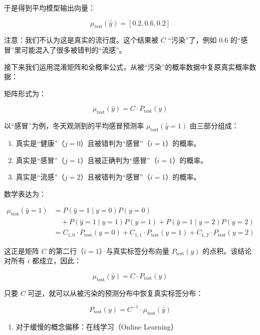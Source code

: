 于是得到平均模型输出向量：

\[
\mu_{\mathrm{test}}(\hat{y})=[0.2,0.6,0.2]
\]

注意：我们不认为这是真实的流行度。这个结果被 \(C\) ``污染''了，例如 \(0.6\) 的``感冒''里可能混入了很多被错判的``流感''。

接下来我们运用混淆矩阵和全概率公式，从被``污染''的概率数据中复原真实概率数据：

矩阵形式为：

\[
\mu_{\mathrm{test}}(\hat{y})=C\cdot P_{\mathrm{test}}(y)
\]

以``感冒''为例，冬天观测到的平均感冒预测率 \(\mu_{\mathrm{test}}(\hat{y}=1)\) 由三部分组成：

\begin{enumerate}
\def\labelenumi{\arabic{enumi}.}
\tightlist
\item
  真实是``健康''（\(j=0\)）且被错判为``感冒''（\(i=1\)）的概率。
\item
  真实是``感冒''（\(j=1\)）且被正确判为``感冒''（\(i=1\)）的概率。
\item
  真实是``流感''（\(j=2\)）且被错判为``感冒''（\(i=1\)）的概率。
\end{enumerate}

数学表达为：

\[
\begin{aligned}
\mu_{\mathrm{test}}(\hat{y}=1)
&=P(\hat{y}=1\mid y=0)P(y=0)\\
&\quad+P(\hat{y}=1\mid y=1)P(y=1)
+P(\hat{y}=1\mid y=2)P(y=2)\\
&=C_{1,0}\cdot P_{\mathrm{test}}(y=0)
+C_{1,1}\cdot P_{\mathrm{test}}(y=1)
+C_{1,2}\cdot P_{\mathrm{test}}(y=2)
\end{aligned}
\]

这正是矩阵 \(C\) 的第二行（\(i=1\)）与真实标签分布向量 \(P_{\mathrm{test}}(y)\) 的点积。该结论对所有 \(i\) 都成立，因此：

\[
\mu_{\mathrm{test}}(\hat{y})=C\cdot P_{\mathrm{test}}(y)
\]

只要 \(C\) 可逆，就可以从被污染的预测分布中恢复真实标签分布：

\[
P_{\mathrm{test}}(y)=C^{-1}\cdot\mu_{\mathrm{test}}(\hat{y})
\]

\begin{enumerate}
\def\labelenumi{\arabic{enumi}.}
\setcounter{enumi}{2}
\tightlist
\item
  对于缓慢的概念偏移：在线学习（Online Learning）
\end{enumerate}

